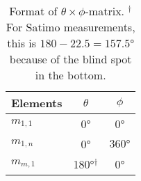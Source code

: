 \begin{table}[htbp]
    \centering
    \begin{tabular}{|l|c|c|}
        \hline
        Elements & $\theta$ & $\phi$ \\
        \hline
        $m_{1,1}$ & \ang{0} & \ang{0} \\
        $m_{1,n}$ & \ang{0} & $\ang{360}$ \\
        $m_{m,1}$ & \ang{180}$^{\dagger}$ & \ang{0} \\
        \hline
    \end{tabular}
    \caption{Format of $\theta\times\phi$-matrix. $^{\dagger}$For Satimo measurements, this is $180-22.5=\ang{157.5}$ because of the blind spot in the bottom.}
    \label{tab:matrixformat}
\end{table}
